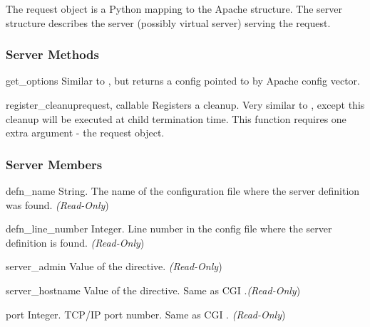 The request object is a Python mapping to the Apache 
structure. The server structure describes the server (possibly virtual
server) serving the request.

\subsubsection{Server Methods\label{pyapi-mpsrv-meth}}

\begin{methoddesc}[server]{get_options}{}
Similar to , but returns a config pointed to
by  Apache config vector. 
\end{methoddesc}

\begin{methoddesc}[server]{register_cleanup}{request, callable}
Registers a cleanup. Very similar to , except
this cleanup will be executed at child termination time. This function
requires one extra argument - the request object.
\end{methoddesc}

\subsubsection{Server Members\label{pyapi-mpsrv-mem}}

\begin{memberdesc}[server]{defn_name}
String. The name of the configuration file where the server definition
was found.
\emph{(Read-Only})
\end{memberdesc}

\begin{memberdesc}[server]{defn_line_number}
Integer. Line number in the config file where the server definition is
found.
\emph{(Read-Only})
\end{memberdesc}

\begin{memberdesc}[server]{server_admin}
Value of the  directive. 
\emph{(Read-Only})
\end{memberdesc}

\begin{memberdesc}[server]{server_hostname}
Value of the  directive. Same as CGI .\emph{(Read-Only})
\end{memberdesc}

\begin{memberdesc}[server]{port}
Integer. TCP/IP port number. Same as CGI .
\emph{(Read-Only})
\end{memberdesc}

